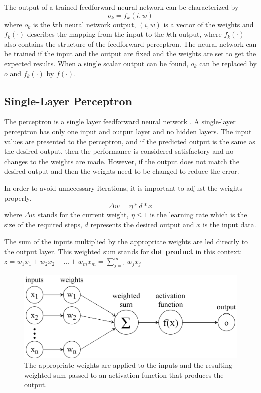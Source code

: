 \noindent The output of a trained feedforward neural network can be characterized by
$$ o_k = f_k(i,w) $$
where $o_k$ is the $k$th neural network output, $(i,w)$ is a vector of the weights and $f_k(\cdot)$ describes the mapping from the input to the $k$th output, where $f_k(\cdot)$ also contains the structure of the feedforward perceptron. The neural network can be trained if the input and the output are fixed and the weights are set to get the expected results. When a single scalar output can be found, $o_k$ can be replaced by $o$ and $f_k(\cdot)$ by $f(\cdot)$.



\subsection{Single-Layer Perceptron}

The perceptron is a single layer feedforward neural network \cite{tho2010perceptron}. A single-layer perceptron has only one input and output layer and no hidden layers. The input values are presented to the perceptron, and if the predicted output is the same as the desired output, then the performance is considered satisfactory and no changes to the weights are made. However, if the output does not match the desired output and then the weights need to be changed to reduce the error. \smallskip

In order to avoid unnecessary iterations, it is important to adjust the weights properly.
$$ \Delta w = \eta * d * x $$
where $\Delta w$ stands for the current weight, $\eta \leq 1$ is the learning rate which is the size of the required steps, $d$ represents the desired output and $x$ is the input data. \medskip

The sum of the inputs multiplied by the appropriate weights are led directly to the output layer. This weighted sum stands for \textbf{dot product} in this context: $ z = w_1 x_1 + w_2 x_2 + \dots + w_m x_m = \sum_{j=1}^m w_j x_j $

\begin{figure}[h]
	\centering
	\includegraphics[height=0.28\linewidth]{./figures/perceptron}
	\caption{The appropriate weights are applied to the inputs and the resulting weighted sum passed to an activation function that produces the output.}
	\label{fig:perceptron}
\end{figure}

